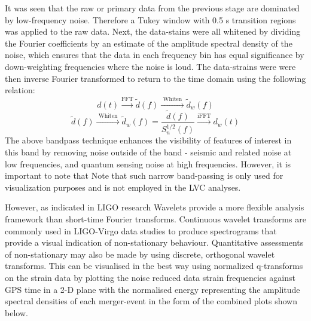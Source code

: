     It was seen that the raw or primary data from the previous stage are dominated by low-frequency noise. Therefore a  Tukey window with 0.5 s transition regions was applied to the raw data. Next, the data-stains were all whitened by dividing the Fourier coefficients by an estimate of the amplitude spectral density of the noise, which ensures that the data in each frequency bin has equal significance by down-weighting frequencies where the noise is loud. The data-strains were were then inverse Fourier transformed to return to the time domain using the following relation:
    \begin{equation}
      d(t) \stackrel{\mathrm{FFT}}{\longrightarrow} \tilde{d}(f) \stackrel{\text { Whiten }}{\longrightarrow} \tilde{d}_{w}(f)
    \end{equation}
    \begin{equation}
      \tilde{d}(f) \stackrel{\text { Whiten }}{\longrightarrow} \tilde{d}_{w}(f) =
      \frac{\tilde{d}(f)}{S_{n}^{1 / 2}(f)} \stackrel{\mathrm{iFFT}}{\longrightarrow}d_{w}(t)
    \end{equation}
The above bandpass technique enhances the visibility of features of interest in this band by removing noise outside of the band - seismic and related noise at low frequencies, and quantum sensing noise at high frequencies. However, it is important to note that Note that such narrow band-passing is only used for visualization purposes and is not employed in the LVC analyses.

    However, as indicated in LIGO research \cite{00.2_schutz2012GWDataAnalysis} \cite{00.3_GravitationalWaveResearch} \cite{00.6_LIGOAnalysisPipeline} \cite{00.5_GWDetectionNoiseCatalogue} Wavelets provide a more
    flexible analysis framework than short-time Fourier transforms. Continuous wavelet transforms are commonly used in LIGO-Virgo data studies to produce spectrograms that provide a visual indication of non-stationary behaviour. Quantitative assessments of non-stationary may also be made by using discrete, orthogonal wavelet transforms. This can be visualised in the best way using normalized q-transforms on the strain data by plotting the noise reduced data strain frequencies against GPS time in a 2-D plane with the normalised energy representing the amplitude spectral densities of each merger-event in the form of the combined plots shown below.

